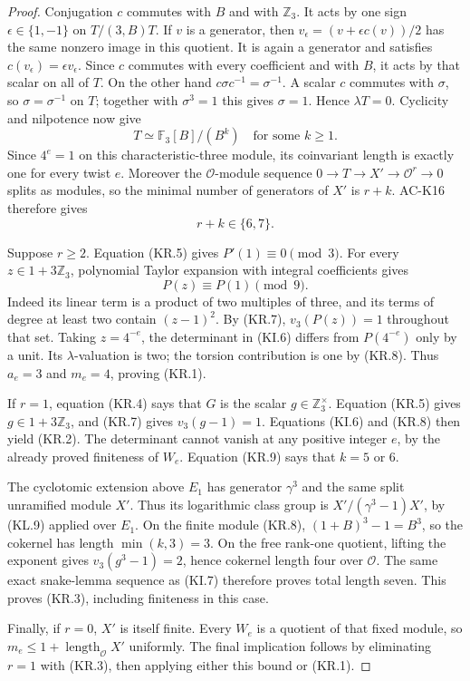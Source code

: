 \begin{proof}
Conjugation $c$ commutes with $B$ and with $\mathbb Z_3$.
It acts by one sign $\epsilon\in\{1,-1\}$ on $T/(3,B)T$.
If $v$ is a generator, then
$v_\epsilon=(v+\epsilon c(v))/2$ has the same nonzero image
in this quotient.  It is again a generator and satisfies
$c(v_\epsilon)=\epsilon v_\epsilon$.
Since $c$ commutes with every coefficient and with $B$,
it acts by that scalar on all of $T$.
On the other hand $c\sigma c^{-1}=\sigma^{-1}$.
A scalar $c$ commutes with $\sigma$, so
$\sigma=\sigma^{-1}$ on $T$; together with $\sigma^3=1$
this gives $\sigma=1$.  Hence $\lambda T=0$.
Cyclicity and nilpotence now give
\[
                 T\simeq\mathbb F_3[B]/(B^k)
                         \quad\text{for some }k\geq1. \tag{KR.8}
\]
Since $4^e=1$ on this characteristic-three module, its
coinvariant length is exactly one for every twist $e$.
Moreover the $\mathcal O$-module sequence
$0\to T\to X'\to\mathcal O^r\to0$ splits as modules,
so the minimal number of generators of $X'$ is $r+k$.
AC-K16 therefore gives
\[
                              r+k\in\{6,7\}.           \tag{KR.9}
\]

Suppose $r\geq2$.  Equation (KR.5) gives $P'(1)\equiv0\pmod3$.
For every $z\in1+3\mathbb Z_3$, polynomial Taylor expansion
with integral coefficients gives
\[
                         P(z)\equiv P(1)\pmod9.
\]
Indeed its linear term is a product of two multiples of three,
and its terms of degree at least two contain $(z-1)^2$.
By (KR.7), $v_3(P(z))=1$ throughout that set.
Taking $z=4^{-e}$, the determinant in (KI.6) differs from
$P(4^{-e})$ only by a unit.  Its $\lambda$-valuation is two;
the torsion contribution is one by (KR.8).  Thus $a_e=3$
and $m_e=4$, proving (KR.1).

If $r=1$, equation (KR.4) says that $G$ is the scalar
$g\in\mathbb Z_3^\times$.  Equation (KR.5) gives
$g\in1+3\mathbb Z_3$, and (KR.7) gives $v_3(g-1)=1$.
Equations (KI.6) and (KR.8) then yield (KR.2).
The determinant cannot vanish at any positive integer $e$,
by the already proved finiteness of $W_e$.
Equation (KR.9) says that $k=5$ or $6$.

The cyclotomic extension above $E_1$ has generator $\gamma^3$
and the same split unramified module $X'$.
Thus its logarithmic class group is
$X'/(\gamma^3-1)X'$, by (KL.9) applied over $E_1$.
On the finite module (KR.8),
$(1+B)^3-1=B^3$, so the cokernel has length
$\min(k,3)=3$.  On the free rank-one quotient, lifting the
exponent gives $v_3(g^3-1)=2$, hence cokernel length four
over $\mathcal O$.  The same exact snake-lemma sequence
as (KI.7) therefore proves total length seven.
This proves (KR.3), including finiteness in this case.

Finally, if $r=0$, $X'$ is itself finite.  Every $W_e$ is
a quotient of that fixed module, so
$m_e\leq1+\operatorname{length}_{\mathcal O}X'$ uniformly.
The final implication follows by eliminating $r=1$ with
(KR.3), then applying either this bound or (KR.1).
\end{proof}

